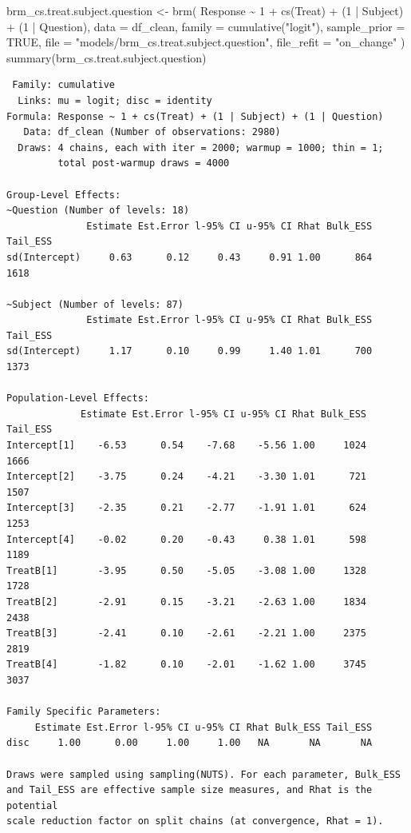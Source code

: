 \documentclass[
  12pt,
  a4paper,
  extrafontsizes,
  onecolumn,
  openright]{memoir}
\newenvironment{Shaded}{\begin{snugshade}}{\end{snugshade}}
\newcommand{\AttributeTok}[1]{\textcolor[rgb]{0.40,0.45,0.13}{#1}}
\newcommand{\ConstantTok}[1]{\textcolor[rgb]{0.56,0.35,0.01}{#1}}
\newcommand{\DecValTok}[1]{\textcolor[rgb]{0.68,0.00,0.00}{#1}}
\newcommand{\FunctionTok}[1]{\textcolor[rgb]{0.28,0.35,0.67}{#1}}
\newcommand{\NormalTok}[1]{\textcolor[rgb]{0.00,0.23,0.31}{#1}}
\newcommand{\OtherTok}[1]{\textcolor[rgb]{0.00,0.23,0.31}{#1}}
\newcommand{\SpecialCharTok}[1]{\textcolor[rgb]{0.37,0.37,0.37}{#1}}
\newcommand{\StringTok}[1]{\textcolor[rgb]{0.13,0.47,0.30}{#1}}
\begin{document}
\begin{Shaded}
\begin{Highlighting}[]
\NormalTok{brm\_cs.treat.subject.question }\OtherTok{\textless{}{-}} \FunctionTok{brm}\NormalTok{(}
\NormalTok{    Response }\SpecialCharTok{\textasciitilde{}} \DecValTok{1} \SpecialCharTok{+} \FunctionTok{cs}\NormalTok{(Treat) }\SpecialCharTok{+}\NormalTok{ (}\DecValTok{1} \SpecialCharTok{|}\NormalTok{ Subject) }\SpecialCharTok{+}\NormalTok{ (}\DecValTok{1} \SpecialCharTok{|}\NormalTok{ Question),}
    \AttributeTok{data =}\NormalTok{ df\_clean,}
    \AttributeTok{family =} \FunctionTok{cumulative}\NormalTok{(}\StringTok{"logit"}\NormalTok{),}
    \AttributeTok{sample\_prior =} \ConstantTok{TRUE}\NormalTok{,}
    \AttributeTok{file =} \StringTok{"models/brm\_cs.treat.subject.question"}\NormalTok{,}
    \AttributeTok{file\_refit =} \StringTok{"on\_change"}
\NormalTok{)}
\FunctionTok{summary}\NormalTok{(brm\_cs.treat.subject.question)}
\end{Highlighting}
\end{Shaded}

\begin{verbatim}
 Family: cumulative 
  Links: mu = logit; disc = identity 
Formula: Response ~ 1 + cs(Treat) + (1 | Subject) + (1 | Question) 
   Data: df_clean (Number of observations: 2980) 
  Draws: 4 chains, each with iter = 2000; warmup = 1000; thin = 1;
         total post-warmup draws = 4000

Group-Level Effects: 
~Question (Number of levels: 18) 
              Estimate Est.Error l-95% CI u-95% CI Rhat Bulk_ESS Tail_ESS
sd(Intercept)     0.63      0.12     0.43     0.91 1.00      864     1618

~Subject (Number of levels: 87) 
              Estimate Est.Error l-95% CI u-95% CI Rhat Bulk_ESS Tail_ESS
sd(Intercept)     1.17      0.10     0.99     1.40 1.01      700     1373

Population-Level Effects: 
             Estimate Est.Error l-95% CI u-95% CI Rhat Bulk_ESS Tail_ESS
Intercept[1]    -6.53      0.54    -7.68    -5.56 1.00     1024     1666
Intercept[2]    -3.75      0.24    -4.21    -3.30 1.01      721     1507
Intercept[3]    -2.35      0.21    -2.77    -1.91 1.01      624     1253
Intercept[4]    -0.02      0.20    -0.43     0.38 1.01      598     1189
TreatB[1]       -3.95      0.50    -5.05    -3.08 1.00     1328     1728
TreatB[2]       -2.91      0.15    -3.21    -2.63 1.00     1834     2438
TreatB[3]       -2.41      0.10    -2.61    -2.21 1.00     2375     2819
TreatB[4]       -1.82      0.10    -2.01    -1.62 1.00     3745     3037

Family Specific Parameters: 
     Estimate Est.Error l-95% CI u-95% CI Rhat Bulk_ESS Tail_ESS
disc     1.00      0.00     1.00     1.00   NA       NA       NA

Draws were sampled using sampling(NUTS). For each parameter, Bulk_ESS
and Tail_ESS are effective sample size measures, and Rhat is the potential
scale reduction factor on split chains (at convergence, Rhat = 1).
\end{verbatim}
\end{document}
